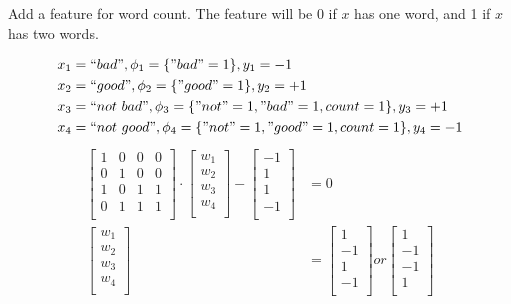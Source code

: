 \documentclass[10pt]{article}
\begin{document}
\begin{enumerate}[label=(\alph*)]
Add a feature for word count. The feature will be 0 if $x$ has one word, and 1 if $x$ has two words.

	\begin{align*}
  x_1 &= ``bad", \phi_1 = \{ "bad" = 1 \}, y_1 = -1\\
  x_2 &=``good", \phi_2 = \{ "good" = 1 \}, y_2 = +1\\
  x_3 &=``not\ bad", \phi_3 = \{ "not" = 1, "bad" = 1, count = 1 \}, y_3 = +1\\
  x_4 &= ``not\ good", \phi_4 = \{ "not" = 1, "good" = 1, count = 1 \}, y_4 = -1\\
  \end{align*}
  \begin{align*}
  \begin{bmatrix}
  1 & 0 & 0 & 0\\
  0 & 1 & 0 & 0\\
  1 & 0 & 1 & 1\\
  0 & 1 & 1 & 1\\
  \end{bmatrix} \cdot \begin{bmatrix}
  w_1\\
  w_2\\
  w_3\\
  w_4\\
  \end{bmatrix} - \begin{bmatrix}
  -1\\
  1\\
  1\\
  -1\\
  \end{bmatrix} &= 0\\
  \begin{bmatrix}
  w_1\\
  w_2\\
  w_3\\
  w_4\\
  \end{bmatrix} &= \begin{bmatrix}
  1\\
  -1\\
  1\\
  -1\\
  \end{bmatrix} or \begin{bmatrix}
  1\\
  -1\\
  -1\\
  1\\
  \end{bmatrix}
  \end{align*}

\end{enumerate}
\end{document}
